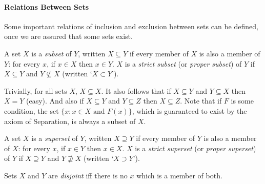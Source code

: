 \paragraph{Relations Between Sets} Some important relations of inclusion and exclusion between sets can be defined, once we are assured that some sets exist.
\begin{definition}[Subset] A set $X$ is a \emph{subset} of $Y$, written
   $X \subseteq Y$ if every
    member of $X$ is also a member of $Y$: for every $x$, if $x \in X$
    then $x \in Y$. $X$ is a \emph{strict subset} (or \emph{proper
    subset}) of $Y$ if $X
    \subseteq Y$ and $Y \not\subseteq X$ (written `$X \subset
Y$').\end{definition}
Trivially, for all sets $X$, $X\subseteq X$. It also follows that if $X \subseteq Y$ and $Y \subseteq X$ then $X=Y$ (easy). And also if $X \subseteq Y$ and $Y \subseteq Z$ then $X \subseteq Z$.
Note that if $F$ is some condition, the set $\{x:x\in X \text{ and } F(x)\}$, which is guaranteed to exist by the axiom of Separation, is always a subset of $X$.
\begin{definition}[Superset] A set $X$ is a \emph{superset} of $Y$, written   $X \supseteq Y$ if every    member of $Y$ is also a member of $X$: for every $x$, if $x \in Y$    then $x \in X$. $X$ is a \emph{strict superset} (or \emph{proper superset}) of $Y$ if $X    \supseteq Y$ and $Y \not\supseteq X$ (written `$X \supset Y$').\end{definition}
\begin{definition}[Disjoint] Sets $X$ and $Y$ are \emph{disjoint} iff there is no $x$ which is a member of both.	
\end{definition}


